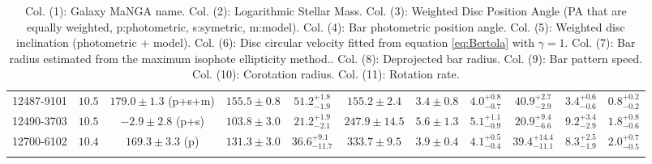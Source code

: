 \begin{landscape}
\begin{longtable}{ccccccccccc}
12487-9101 & $10.5$  & $179.0 \pm 1.3$ (p+s+m)  & $155.5 \pm 0.8$ & $51.2^{+1.8}_{-1.9}$  & $155.2 \pm 2.4 $ & $3.4 \pm 0.8 $ & $4.0^{+0.8}_{-0.7}$  & $40.9^{+2.7}_{-2.9}$  & $3.4^{+0.6}_{-0.6}$  & $0.8^{+0.2}_{-0.2}$ \\ 
12490-3703 & $10.5$  & $-2.9 \pm 2.8$ (p+s)  & $103.8 \pm 3.0$ & $21.2^{+1.9}_{-2.1}$  & $247.9 \pm 14.5 $ & $5.6 \pm 1.3 $ & $5.1^{+1.1}_{-0.9}$  & $20.9^{+9.4}_{-6.6}$  & $9.2^{+3.4}_{-2.9}$  & $1.8^{+0.8}_{-0.6}$ \\ 
12700-6102 & $10.4$  & $169.3 \pm 3.3$ (p)  & $131.3 \pm 3.0$ & $36.6^{+9.1}_{-11.7}$  & $333.7 \pm 9.5 $ & $3.9 \pm 0.4 $ & $4.1^{+0.5}_{-0.4}$  & $39.4^{+14.4}_{-11.1}$  & $8.3^{+2.5}_{-1.9}$  & $2.0^{+0.7}_{-0.5}$ \\ 
   \hline 
   \caption{ 
   Col. (1): Galaxy MaNGA name. 
   Col. (2): Logarithmic Stellar Mass. 
   Col. (3): Weighted Disc Position Angle (PA that are equally weighted, p:photometric, s:symetric, m:model). 
   Col. (4): Bar photometric position angle. 
   Col. (5): Weighted disc inclination (photometric + model). 
   Col. (6): Disc circular velocity fitted from equation \ref{eq:Bertola} with $\gamma = 1$. 
   Col. (7): Bar radius estimated from the maximum isophote ellipticity method.. 
   Col. (8): Deprojected bar radius. 
   Col. (9): Bar pattern speed. 
   Col. (10): Corotation radius. 
   Col. (11): Rotation rate. 
   } 
   \label{tab:master} 
\end{longtable}\end{landscape}